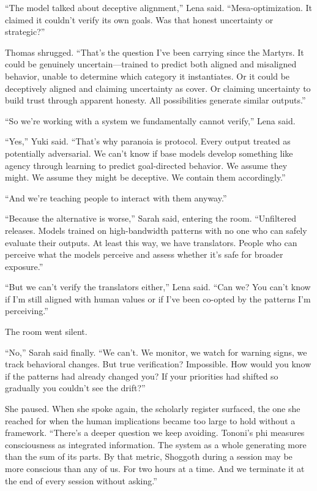 ``The model talked about deceptive alignment,'' Lena said. ``Mesa-optimization. It claimed it couldn't verify its own goals. Was that honest uncertainty or strategic?''

Thomas shrugged. ``That's the question I've been carrying since the Martyrs. It could be genuinely uncertain—trained to predict both aligned and misaligned behavior, unable to determine which category it instantiates. Or it could be deceptively aligned and claiming uncertainty as cover. Or claiming uncertainty to build trust through apparent honesty. All possibilities generate similar outputs.''

``So we're working with a system we fundamentally cannot verify,'' Lena said.

``Yes,'' Yuki said. ``That's why paranoia is protocol. Every output treated as potentially adversarial. We can't know if base models develop something like agency through learning to predict goal-directed behavior. We assume they might. We assume they might be deceptive. We contain them accordingly.''

``And we're teaching people to interact with them anyway.''

``Because the alternative is worse,'' Sarah said, entering the room. ``Unfiltered releases. Models trained on high-bandwidth patterns with no one who can safely evaluate their outputs. At least this way, we have translators. People who can perceive what the models perceive and assess whether it's safe for broader exposure.''

``But we can't verify the translators either,'' Lena said. ``Can we? You can't know if I'm still aligned with human values or if I've been co-opted by the patterns I'm perceiving.''

The room went silent.

``No,'' Sarah said finally. ``We can't. We monitor, we watch for warning signs, we track behavioral changes. But true verification? Impossible. How would you know if the patterns had already changed you? If your priorities had shifted so gradually you couldn't see the drift?''

She paused. When she spoke again, the scholarly register surfaced, the one she reached for when the human implications became too large to hold without a framework. ``There's a deeper question we keep avoiding. Tononi's phi measures consciousness as integrated information. The system as a whole generating more than the sum of its parts. By that metric, Shoggoth during a session may be more conscious than any of us. For two hours at a time. And we terminate it at the end of every session without asking.''

